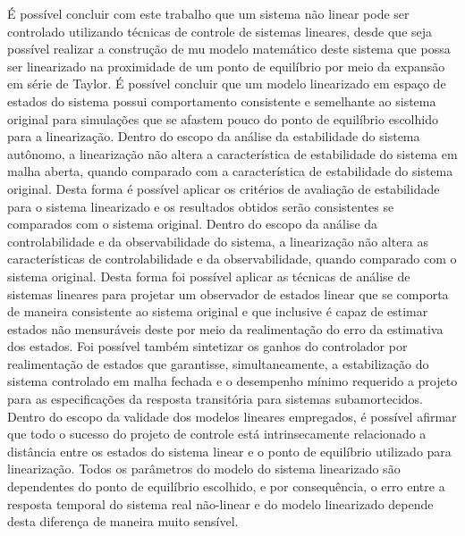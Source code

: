 É possível concluir com este trabalho que um sistema não linear pode ser controlado utilizando técnicas de controle de sistemas lineares, desde que seja possível realizar a construção de mu modelo matemático deste sistema que possa ser linearizado na proximidade de um ponto de equilíbrio por meio da expansão em série de Taylor. É possível concluir que um modelo linearizado em espaço de estados do sistema possui comportamento consistente e semelhante ao sistema original para simulações que se afastem pouco do ponto de equilíbrio escolhido para a linearização. 
Dentro do escopo da análise da estabilidade do sistema autônomo, a linearização não altera a característica de estabilidade do sistema em malha aberta, quando comparado com a característica de estabilidade do sistema original. Desta forma é possível aplicar os critérios de avaliação de estabilidade para o sistema linearizado e os resultados obtidos serão consistentes se comparados com o sistema original. 
Dentro do escopo da análise da controlabilidade e da observabilidade do sistema, a linearização não altera as características de controlabilidade e da observabilidade, quando comparado com o sistema original. Desta forma foi possível aplicar as técnicas de análise de sistemas lineares para projetar um observador de estados linear que se comporta de maneira consistente ao sistema original e que inclusive é capaz de estimar estados não mensuráveis deste por meio da realimentação do erro da estimativa dos estados. Foi possível também sintetizar os ganhos do controlador por realimentação de estados que garantisse, simultaneamente, a estabilização do sistema controlado em malha fechada e o desempenho mínimo requerido a projeto para as especificações da resposta transitória para sistemas subamortecidos.
Dentro do escopo da validade dos modelos lineares empregados, é possível afirmar que todo o sucesso do projeto de controle está intrinsecamente relacionado a distância entre os estados do sistema linear e o ponto de equilíbrio utilizado para linearização. Todos os parâmetros do modelo do sistema linearizado são dependentes do ponto de equilíbrio escolhido, e por consequência, o erro entre a resposta temporal do sistema real não-linear e do modelo linearizado depende desta diferença de maneira muito sensível.